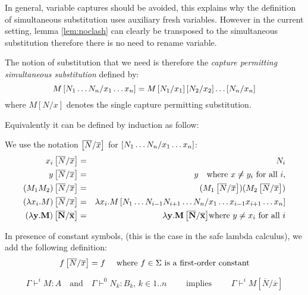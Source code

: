 In general, variable captures should be avoided, this explains why the definition
of simultaneous substitution uses auxiliary fresh variables.
However in the current setting, lemma \ref{lem:noclash} can clearly be transposed to
the simultaneous substitution therefore there is no need to rename variable.

The notion of substitution that we need is therefore
the \emph{capture permitting simultaneous substitution} defined by:
$$M\left[ N_1 \ldots N_n/x_1 \ldots x_n \right] = M \left[ N_1/x_1 \right] \left[ N_2/x_2 \right] \ldots \left[ N_n/x_n \right] $$
where $M[N/x]$ denotes the single capture permitting substitution.

Equivalently it can be defined by induction as follow:

\begin{dfn}
 We use the notation
$\left[ \overline{N}/\overline{x} \right]$ for $\left[ N_1 \ldots N_n/x_1
\ldots x_n \right]$:
\begin{eqnarray*}
 x_i \left[ \overline{N}/\overline{x} \right] &=& N_i\\
 y \left[ \overline{N}/\overline{x} \right] &=& y \quad \mbox{where } x \not \neq y_i \mbox{ for all } i,\\
(M_1 M_2) \left[ \overline{N}/\overline{x} \right] &=& (M_1 \left[ \overline{N}/\overline{x} \right]) (M_2 \left[ \overline{N}/\overline{x} \right])\\
(\lambda x_i . M) \left[ \overline{N}/\overline{x} \right] &=& \lambda x_i . M
\left[ N_1 \ldots N_{i-1} N_{i+1}\ldots N_n/x_1 \ldots x_{i-1} x_{i+1}\ldots x_n \right] \\
\mathbf{(\lambda y . M) \left[ \overline{N}/\overline{x} \right]} &=& \mathbf{\lambda y . M \left[ \overline{N}/\overline{x} \right]} \mbox{where $y \not = x_i$ for all $i$}
\end{eqnarray*}

In presence of constant symbols, (this is the case in the safe
lambda calculus), we add the following definition:
$$f \left[ \overline{N}/\overline{x} \right] = f \quad \mbox{ where $f \in \Sigma$ is a first-order constant}$$
\end{dfn}

\begin{prop}
$$ \Gamma \vdash^i M : A
\quad \mbox{and} \quad \Gamma \vdash^0 N_k : B_k \mbox{, } k \in 1..n
\qquad \mbox{ implies } \qquad
\Gamma \vdash^i M[\overline{N}/\overline{x}]$$
\end{prop}

